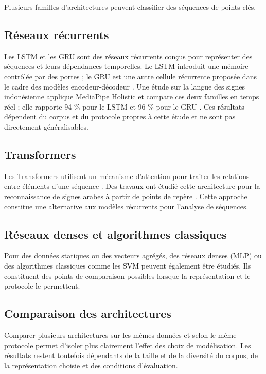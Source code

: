 Plusieurs familles d'architectures peuvent classifier des séquences de points clés.

\subsection{Réseaux récurrents}

Les LSTM et les GRU sont des réseaux récurrents conçus pour représenter des séquences et leurs dépendances temporelles. Le LSTM introduit une mémoire contrôlée par des portes \cite{Hochreiter1997LSTM} ; le GRU est une autre cellule récurrente proposée dans le cadre des modèles encodeur-décodeur \cite{Cho2014GRU}. Une étude sur la langue des signes indonésienne applique MediaPipe Holistic et compare ces deux familles en temps réel ; elle rapporte 94 \% pour le LSTM et 96 \% pour le GRU \cite{Ilham2024Indonesian}. Ces résultats dépendent du corpus et du protocole propres à cette étude et ne sont pas directement généralisables.

\subsection{Transformers}

Les Transformers utilisent un mécanisme d'attention pour traiter les relations entre éléments d'une séquence \cite{Vaswani2017}. Des travaux ont étudié cette architecture pour la reconnaissance de signes arabes à partir de points de repère \cite{Alyami2023Arabic}. Cette approche constitue une alternative aux modèles récurrents pour l'analyse de séquences.

\subsection{Réseaux denses et algorithmes classiques}

Pour des données statiques ou des vecteurs agrégés, des réseaux denses (MLP) ou des algorithmes classiques comme les SVM peuvent également être étudiés. Ils constituent des points de comparaison possibles lorsque la représentation et le protocole le permettent.

\subsection{Comparaison des architectures}

Comparer plusieurs architectures sur les mêmes données et selon le même protocole permet d'isoler plus clairement l'effet des choix de modélisation. Les résultats restent toutefois dépendants de la taille et de la diversité du corpus, de la représentation choisie et des conditions d'évaluation.

